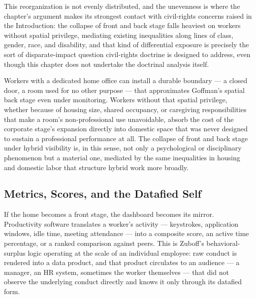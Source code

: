 \documentclass[10pt]{article}
\begin{document}
This reorganization is not evenly distributed, and the unevenness is where the chapter's argument makes its strongest contact with civil-rights concerns raised in the Introduction: the collapse of front and back stage falls heaviest on workers without spatial privilege, mediating existing inequalities along lines of class, gender, race, and disability, and that kind of differential exposure is precisely the sort of disparate-impact question civil-rights doctrine is designed to address, even though this chapter does not undertake the doctrinal analysis itself.

Workers with a dedicated home office can install a durable boundary --- a closed door, a room used for no other purpose --- that approximates Goffman's spatial back stage even under monitoring. Workers without that spatial privilege, whether because of housing size, shared occupancy, or caregiving responsibilities that make a room's non-professional use unavoidable, absorb the cost of the corporate stage's expansion directly into domestic space that was never designed to sustain a professional performance at all. The collapse of front and back stage under hybrid visibility is, in this sense, not only a psychological or disciplinary phenomenon but a material one, mediated by the same inequalities in housing and domestic labor that structure hybrid work more broadly.

\subsection{Metrics, Scores, and the Datafied Self}

If the home becomes a front stage, the dashboard becomes its mirror. Productivity software translates a worker's activity --- keystrokes, application windows, idle time, meeting attendance --- into a composite score, an active time percentage, or a ranked comparison against peers. This is Zuboff's behavioral-surplus logic operating at the scale of an individual employee: raw conduct is rendered into a data product, and that product circulates to an audience --- a manager, an HR system, sometimes the worker themselves --- that did not observe the underlying conduct directly and knows it only through its datafied form.
\end{document}
